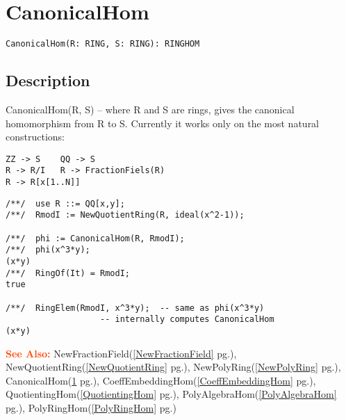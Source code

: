 \documentclass[a4paper]{mybook}
\newenvironment{command}{}{} %
\newcommand\SeeAlso{\par\textcolor{OrangeRed}{\textbf{\large See Also: }}}
\begin{document}
\section{CanonicalHom}
\label{CanonicalHom}
\begin{command} %


\begin{Verbatim}[label=syntax, rulecolor=\color{MidnightBlue},
frame=single]
CanonicalHom(R: RING, S: RING): RINGHOM
\end{Verbatim}


\subsection*{Description}

CanonicalHom(R, S) -- where R and S are rings, gives the
canonical homomorphism from R to S.
Currently it works only on the most natural constructions:
\begin{verbatim}
ZZ -> S    QQ -> S
R -> R/I   R -> FractionFiels(R)
R -> R[x[1..N]]
\end{verbatim}
\begin{Verbatim}[label=example, rulecolor=\color{PineGreen}, frame=single]
/**/  use R ::= QQ[x,y];
/**/  RmodI := NewQuotientRing(R, ideal(x^2-1));

/**/  phi := CanonicalHom(R, RmodI);
/**/  phi(x^3*y);
(x*y)
/**/  RingOf(It) = RmodI;
true

/**/  RingElem(RmodI, x^3*y);  -- same as phi(x^3*y)
			       -- internally computes CanonicalHom
(x*y)
\end{Verbatim}


\SeeAlso %
  NewFractionField(\ref{NewFractionField} pg.\pageref{NewFractionField}), 
    NewQuotientRing(\ref{NewQuotientRing} pg.\pageref{NewQuotientRing}), 
    NewPolyRing(\ref{NewPolyRing} pg.\pageref{NewPolyRing}), 
    CanonicalHom(\ref{CanonicalHom} pg.\pageref{CanonicalHom}), 
    CoeffEmbeddingHom(\ref{CoeffEmbeddingHom} pg.\pageref{CoeffEmbeddingHom}), 
    QuotientingHom(\ref{QuotientingHom} pg.\pageref{QuotientingHom}), 
    PolyAlgebraHom(\ref{PolyAlgebraHom} pg.\pageref{PolyAlgebraHom}), 
    PolyRingHom(\ref{PolyRingHom} pg.\pageref{PolyRingHom})
\end{command} %
\end{document}
